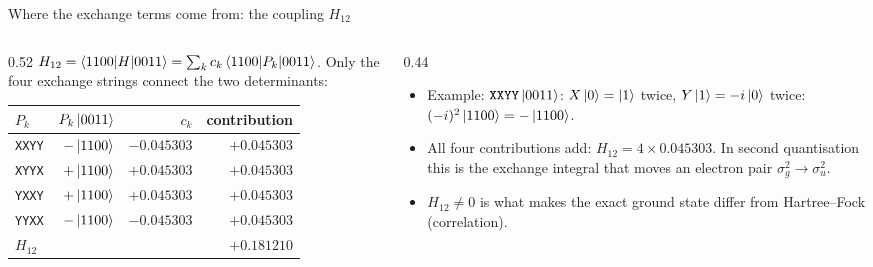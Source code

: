 \documentclass[aspectratio=169,11pt]{beamer}
\begin{document}
\begin{frame}{Where the exchange terms come from: the coupling $H_{12}$}
  \begin{columns}[T]
    \begin{column}{0.52\textwidth}
      $H_{12} = \braket{1100|H|0011} = \sum_kc_k\braket{1100|P_k|0011}$. Only the four exchange strings connect the two determinants:
      \small
      \begin{center}
      \begin{tabular}{lrrr}
        \toprule $P_k$ & $P_k\ket{0011}$ & $c_k$ & contribution\\ \midrule
        \texttt{XXYY} & $-\ket{1100}$ & $-0.045303$ & $+0.045303$\\
        \texttt{XYYX} & $+\ket{1100}$ & $+0.045303$ & $+0.045303$\\
        \texttt{YXXY} & $+\ket{1100}$ & $+0.045303$ & $+0.045303$\\
        \texttt{YYXX} & $-\ket{1100}$ & $-0.045303$ & $+0.045303$\\ \midrule
        \multicolumn{3}{l}{$H_{12}$} & $+0.181210$\\ \bottomrule
      \end{tabular}
      \end{center}
    \end{column}
    \begin{column}{0.44\textwidth}
      \begin{itemize}
        \item Example: $\texttt{XXYY}\ket{0011}$: $X\ket0 = \ket1$ twice, $Y\ket1 = -i\ket0$ twice: $(-i)^2\ket{1100} = -\ket{1100}$.
        \item All four contributions add: $H_{12} = 4\times0.045303$. In second quantisation this is the exchange integral that moves an
          electron pair $\sigma_g^2 \to \sigma_u^2$.
        \item $H_{12} \ne 0$ is what makes the exact ground state differ from Hartree--Fock (correlation).
      \end{itemize}
    \end{column}
  \end{columns}
\end{frame}
\end{document}
